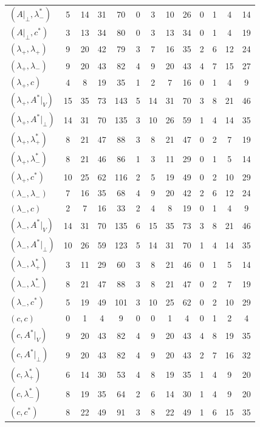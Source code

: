 \documentclass[11pt]{article}
\numberwithin{equation}{section}
\theoremstyle{plain}
\theoremstyle{definition}
\begin{document}
\begin{longtable}{l|cccc|cccc|cccc}
$(A|_\perp,\lambda^*_-)$ & 5 & 14 & 31 & 70 & 0 & 3 & 10 & 26 & 0 & 1 & 4 & 14\\
$(A|_\perp,c^*)$ & 3 & 13 & 34 & 80 & 0 & 3 & 13 & 34 & 0 & 1 & 4 & 19\\
$(\lambda_+,\lambda_+)$ & 9 & 20 & 42 & 79 & 3 & 7 & 16 & 35 & 2 & 6 & 12 & 24\\
$(\lambda_+,\lambda_-)$ & 9 & 20 & 43 & 82 & 4 & 9 & 20 & 43 & 4 & 7 & 15 & 27\\
$(\lambda_+,c)$ & 4 & 8 & 19 & 35 & 1 & 2 & 7 & 16 & 0 & 1 & 4 & 9\\
$(\lambda_+,A^*|_V)$ & 15 & 35 & 73 & 143 & 5 & 14 & 31 & 70 & 3 & 8 & 21 & 46\\
$(\lambda_+,A^*|_\perp)$ & 14 & 31 & 70 & 135 & 3 & 10 & 26 & 59 & 1 & 4 & 14 & 35\\
$(\lambda_+,\lambda^*_+)$ & 8 & 21 & 47 & 88 & 3 & 8 & 21 & 47 & 0 & 2 & 7 & 19\\
$(\lambda_+,\lambda^*_-)$ & 8 & 21 & 46 & 86 & 1 & 3 & 11 & 29 & 0 & 1 & 5 & 14\\
$(\lambda_+,c^*)$ & 10 & 25 & 62 & 116 & 2 & 5 & 19 & 49 & 0 & 2 & 10 & 29\\
$(\lambda_-,\lambda_-)$ & 7 & 16 & 35 & 68 & 4 & 9 & 20 & 42 & 2 & 6 & 12 & 24\\
$(\lambda_-,c)$ & 2 & 7 & 16 & 33 & 2 & 4 & 8 & 19 & 0 & 1 & 4 & 9\\
$(\lambda_-,A^*|_V)$ & 14 & 31 & 70 & 135 & 6 & 15 & 35 & 73 & 3 & 8 & 21 & 46\\
$(\lambda_-,A^*|_\perp)$ & 10 & 26 & 59 & 123 & 5 & 14 & 31 & 70 & 1 & 4 & 14 & 35\\
$(\lambda_-,\lambda^*_+)$ & 3 & 11 & 29 & 60 & 3 & 8 & 21 & 46 & 0 & 1 & 5 & 14\\
$(\lambda_-,\lambda^*_-)$ & 8 & 21 & 47 & 88 & 3 & 8 & 21 & 47 & 0 & 2 & 7 & 19\\
$(\lambda_-,c^*)$ & 5 & 19 & 49 & 101 & 3 & 10 & 25 & 62 & 0 & 2 & 10 & 29\\
$(c,c)$ & 0 & 1 & 4 & 9 & 0 & 0 & 1 & 4 & 0 & 1 & 2 & 4\\
$(c,A^*|_V)$ & 9 & 20 & 43 & 82 & 4 & 9 & 20 & 43 & 4 & 8 & 19 & 35\\
$(c,A^*|_\perp)$ & 9 & 20 & 43 & 82 & 4 & 9 & 20 & 43 & 2 & 7 & 16 & 32\\
$(c,\lambda^*_+)$ & 6 & 14 & 30 & 53 & 4 & 8 & 19 & 35 & 1 & 4 & 9 & 20\\
$(c,\lambda^*_-)$ & 8 & 19 & 35 & 64 & 2 & 6 & 14 & 30 & 1 & 4 & 9 & 20\\
$(c,c^*)$ & 8 & 22 & 49 & 91 & 3 & 8 & 22 & 49 & 1 & 6 & 15 & 35\\

\end{longtable}
\end{document}
